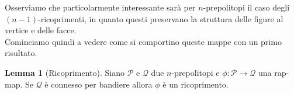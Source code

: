 \documentclass[a4paper,12pt]{report}
\newcommand{\p}{\mathcal{P}}
\theoremstyle{plain}
\theoremstyle{definition}
\newtheorem{lem}[teo]{Lemma}
\begin{document}
Osserviamo che particolarmente interessante sar\`a per $n$-prepolitopi il caso degli $(n-1)$-ricoprimenti, in quanto questi
preservano la struttura delle figure al vertice e delle facce.\\
Cominciamo quindi a vedere come si comportino queste mappe con un primo risultato.
\begin{lem}[Ricoprimento]
Siano $\p$ e $\mathcal{Q}$ due $n$-prepolitopi e $\phi:\p\longrightarrow\mathcal{Q}$ una rap-map. Se $\mathcal{Q}$ \`e connesso per bandiere allora
$\phi$ \`e un ricoprimento.
\end{lem}
\end{document}
